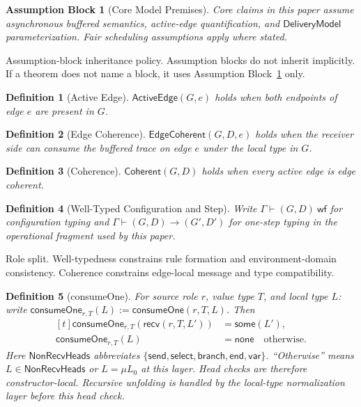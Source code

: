 \documentclass[a4paper,10pt,twocolumn,english]{article}
\numberwithin{equation}{section}
\theoremstyle{paperdef}
\newtheorem{definition}{Definition}[section]
\theoremstyle{paperplain}
\theoremstyle{paperdef}
\newtheorem{assumption}{Assumption Block}[section]
\theoremstyle{paperremark}
\newcommand{\Coherent}{\ensuremath{\mathsf{Coherent}}}
\newcommand{\EdgeCoherent}{\ensuremath{\mathsf{EdgeCoherent}}}
\newcommand{\ActiveEdge}{\ensuremath{\mathsf{ActiveEdge}}}
\newcommand{\DeliveryModel}{\ensuremath{\mathsf{DeliveryModel}}}
\newcommand{\wf}{\ensuremath{\mathsf{wf}}}
\newcommand{\consumeOne}{\ensuremath{\mathsf{consumeOne}}}
\begin{document}
\begin{assumption}[Core Model Premises]
	\label{assump:p1-core}
	Core claims in this paper assume asynchronous buffered semantics, active-edge quantification, and \DeliveryModel parameterization. Fair scheduling assumptions apply where stated.
\end{assumption}

Assumption-block inheritance policy. Assumption blocks do not inherit implicitly. If a theorem does not name a block, it uses Assumption Block~\ref{assump:p1-core} only.

\begin{definition}[Active Edge]
	$\ActiveEdge(G, e)$ holds when both endpoints of edge $e$ are present in $G$.
\end{definition}

\begin{definition}[Edge Coherence]
	$\EdgeCoherent(G, D, e)$ holds when the receiver side can consume the buffered trace on edge $e$ under the local type in $G$.
\end{definition}

\begin{definition}[Coherence]
	$\Coherent(G, D)$ holds when every active edge is edge coherent.
\end{definition}

\begin{definition}[Well-Typed Configuration and Step]
	Write $\Gamma \vdash (G,D)\ \wf$ for configuration typing and
	$\Gamma \vdash (G,D)\to(G',D')$ for one-step typing in the operational
	fragment used by this paper.
\end{definition}

Role split. Well-typedness constrains rule formation and environment-domain
consistency. Coherence constrains edge-local message and type compatibility.

\begin{definition}[consumeOne]
	For source role $r$, value type $T$, and local type $L$:
	write $\consumeOne_{r,T}(L):=\consumeOne(r,T,L)$. Then
	\[
		\begin{aligned}[t]
			\consumeOne_{r,T}(\mathsf{recv}(r,T,L')) & = \mathsf{some}(L'),                  \\
			\consumeOne_{r,T}(L)                     & = \mathsf{none}\quad\text{otherwise.}
		\end{aligned}
	\]
	Here $\mathsf{NonRecvHeads}$ abbreviates
	$\{\mathsf{send},\mathsf{select},\mathsf{branch},\mathsf{end},\mathsf{var}\}$.
	``Otherwise'' means $L\in\mathsf{NonRecvHeads}$ or $L=\mu L_0$ at this layer.
	Head checks are therefore constructor-local. Recursive unfolding is handled by
	the local-type normalization layer before this head check.
\end{definition}
\end{document}
